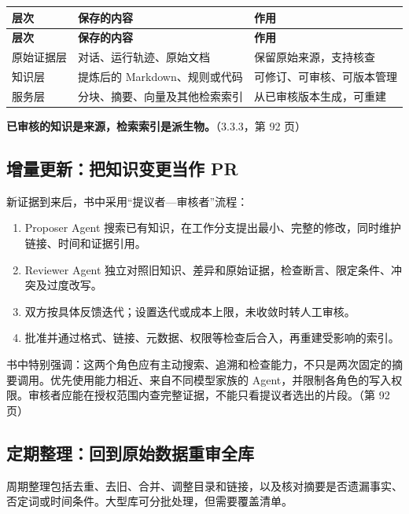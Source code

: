 \documentclass[UTF8,a4paper,11pt]{ctexart}
\newlength{\tableusable}
\begin{document}
\begingroup\small
\setlength{\tableusable}{\dimexpr\linewidth-4\tabcolsep\relax}
\begin{longtable}{@{}>{\raggedright\arraybackslash}p{0.2\tableusable}>{\raggedright\arraybackslash}p{0.36\tableusable}>{\raggedright\arraybackslash}p{0.44\tableusable}@{}}
\toprule
\textbf{层次} & \textbf{保存的内容} & \textbf{作用} \\
\midrule\endfirsthead
\toprule
\textbf{层次} & \textbf{保存的内容} & \textbf{作用} \\
\midrule\endhead
\bottomrule\endfoot
原始证据层 & 对话、运行轨迹、原始文档 & 保留原始来源，支持核查 \\
知识层 & 提炼后的 Markdown、规则或代码 & 可修订、可审核、可版本管理 \\
服务层 & 分块、摘要、向量及其他检索索引 & 从已审核版本生成，可重建 \\
\end{longtable}\endgroup

\textbf{已审核的知识是来源，检索索引是派生物。}（3.3.3，第 92 页）

\subsection{增量更新：把知识变更当作 PR}

新证据到来后，书中采用“提议者—审核者”流程：

\begin{enumerate}
\item Proposer Agent 搜索已有知识，在工作分支提出最小、完整的修改，同时维护链接、时间和证据引用。
\item Reviewer Agent 独立对照旧知识、差异和原始证据，检查断言、限定条件、冲突及过度改写。
\item 双方按具体反馈迭代；设置迭代或成本上限，未收敛时转人工审核。
\item 批准并通过格式、链接、元数据、权限等检查后合入，再重建受影响的索引。
\end{enumerate}

书中特别强调：这两个角色应有主动搜索、追溯和检查能力，不只是两次固定的摘要调用。优先使用能力相近、来自不同模型家族的 Agent，并限制各角色的写入权限。审核者应能在授权范围内查完整证据，不能只看提议者选出的片段。（第 92 页）

\subsection{定期整理：回到原始数据重审全库}

周期整理包括去重、去旧、合并、调整目录和链接，以及核对摘要是否遗漏事实、否定词或时间条件。大型库可分批处理，但需要覆盖清单。
\end{document}

